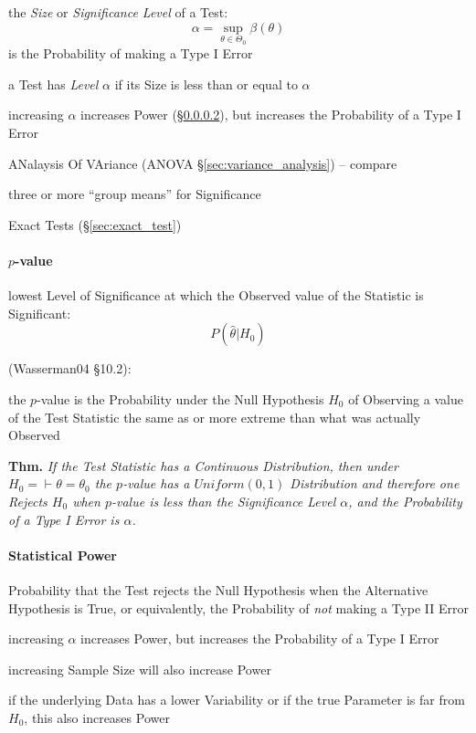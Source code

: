 the \emph{Size} or \emph{Significance Level} of a Test:
\[
  \alpha = \sup_{\theta \in \Theta_0} \beta(\theta)
\]
is the Probability of making a Type I Error

a Test has \emph{Level} $\alpha$ if its Size is less than or equal to $\alpha$

increasing $\alpha$ increases Power (\S\ref{sec:statistical_power}), but
increases the Probability of a Type I Error

\fist ANalaysis Of VAriance (ANOVA \S\ref{sec:variance_analysis}) -- compare

three or more ``group means'' for Significance

Exact Tests (\S\ref{sec:exact_test})



\paragraph{$p$-value}\label{sec:p_value}\hfill

lowest Level of Significance at which the Observed value of the Statistic is
Significant:
\[
  P(\hat{\theta} | H_0)
\]

(Wasserman04 \S10.2):

the $p$-value is the Probability under the Null Hypothesis $H_0$ of Observing a
value of the Test Statistic the same as or more extreme than what was actually
Observed

\textbf{Thm.} \emph{
  If the Test Statistic has a Continuous Distribution, then under
  $H_0 = \vdash \theta = \theta_0$ the $p$-value has a $Uniform(0,1)$
  Distribution and therefore one Rejects $H_0$ when $p$-value is less than the
  Significance Level $\alpha$, and the Probability of a Type I Error is
  $\alpha$.
}



\paragraph{Statistical Power}\label{sec:statistical_power}\hfill

Probability that the Test rejects the Null Hypothesis when the Alternative
Hypothesis is True, or equivalently, the Probability of \emph{not} making a Type
II Error

increasing $\alpha$ increases Power, but increases the Probability of a Type I
Error

increasing Sample Size will also increase Power

if the underlying Data has a lower Variability or if the true Parameter is far
from $H_0$, this also increases Power



